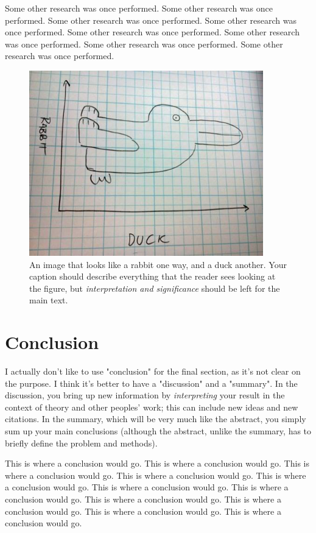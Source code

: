 \documentclass[11pt]{ucscthesisbs}
\begin{document}
Some other research was once performed.
Some other research was once performed.
Some other research was once performed.
Some other research was once performed.
Some other research was once performed.
Some other research was once performed.
Some other research was once performed.
Some other research was once performed.

\begin{figure}[t!]
 \centerline{
  \includegraphics[width=4.0in]{rabbit-or-duck.jpg}
 }
\caption[Rabbit or duck?]
{An image that looks like a rabbit one way, and a duck another.  Your caption should describe everything that the reader sees looking at the figure, but {\it interpretation and significance} should be left for the main text.
}
\label{fig:jpgfile}
\end{figure}

\chapter{Conclusion}

I actually don't like to use "conclusion" for the final section, as it's not clear on the purpose.  I think it's better to have a "discussion" and a "summary".  In the discussion, you bring up new information by {\it interpreting} your result in the context of theory and other peoples' work; this can include new ideas and new citations.  In the summary, which will be very much like the abstract, you simply sum up your main conclusions (although the abstract, unlike the summary, has to briefly define the problem and methods).

This is where a conclusion would go.
This is where a conclusion would go.
This is where a conclusion would go.
This is where a conclusion would go.
This is where a conclusion would go.
This is where a conclusion would go.
This is where a conclusion would go.
This is where a conclusion would go.
This is where a conclusion would go.
This is where a conclusion would go.
This is where a conclusion would go.
\end{document}
